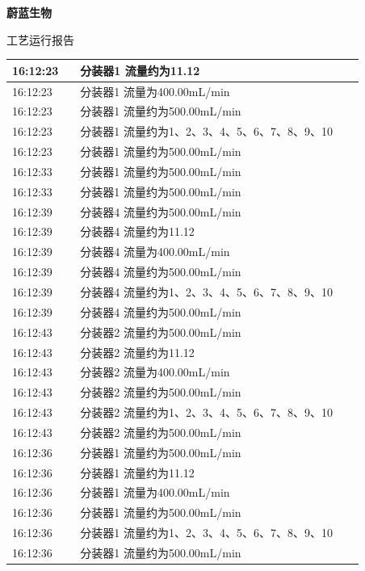\documentclass[UTF8,10pt,a4paper,fontset=fandol]{ctexart}
\begin{document}
\begin{center}
\begin{minipage}[t]{0.47\linewidth}
\centering
\textbf{蔚蓝生物}

\vspace{0.2em}
工艺运行报告

\vspace{0.3em}
\begin{tabular}{|p{0.18\linewidth}|p{0.75\linewidth}|}
\hline
16:12:23 & 分装器1 流量约为11.12 \\ \hline
16:12:23 & 分装器1 流量为400.00mL/min \\ \hline
16:12:23 & 分装器1 流量约为500.00mL/min \\ \hline
16:12:23 & 分装器1 流量约为1、2、3、4、5、6、7、8、9、10 \\ \hline
16:12:23 & 分装器1 流量约为500.00mL/min \\ \hline
16:12:33 & 分装器1 流量约为500.00mL/min \\ \hline
16:12:33 & 分装器1 流量约为500.00mL/min \\ \hline
16:12:39 & 分装器4 流量约为500.00mL/min \\ \hline
16:12:39 & 分装器4 流量约为11.12 \\ \hline
16:12:39 & 分装器4 流量为400.00mL/min \\ \hline
16:12:39 & 分装器4 流量约为500.00mL/min \\ \hline
16:12:39 & 分装器4 流量约为1、2、3、4、5、6、7、8、9、10 \\ \hline
16:12:39 & 分装器4 流量约为500.00mL/min \\ \hline
16:12:43 & 分装器2 流量约为500.00mL/min \\ \hline
16:12:43 & 分装器2 流量约为11.12 \\ \hline
16:12:43 & 分装器2 流量为400.00mL/min \\ \hline
16:12:43 & 分装器2 流量约为500.00mL/min \\ \hline
16:12:43 & 分装器2 流量约为1、2、3、4、5、6、7、8、9、10 \\ \hline
16:12:43 & 分装器2 流量约为500.00mL/min \\ \hline
16:12:36 & 分装器1 流量约为500.00mL/min \\ \hline
16:12:36 & 分装器1 流量约为11.12 \\ \hline
16:12:36 & 分装器1 流量为400.00mL/min \\ \hline
16:12:36 & 分装器1 流量约为500.00mL/min \\ \hline
16:12:36 & 分装器1 流量约为1、2、3、4、5、6、7、8、9、10 \\ \hline
16:12:36 & 分装器1 流量约为500.00mL/min \\ \hline
\end{tabular}


\end{minipage}
\end{center}
\end{document}
